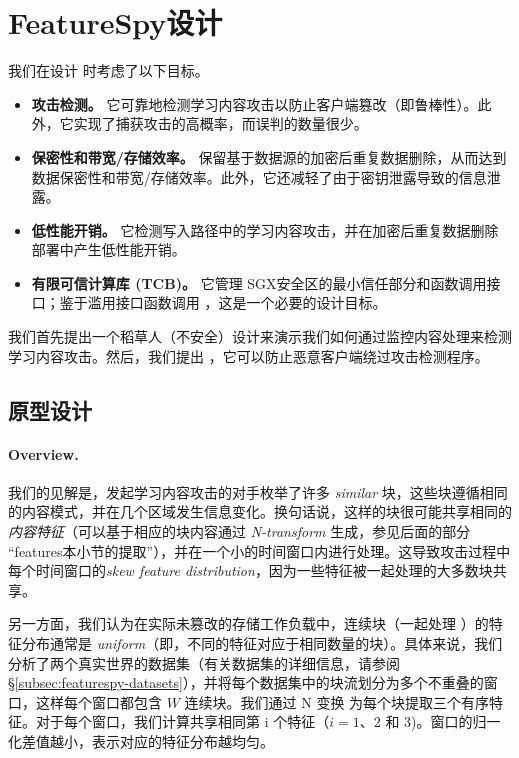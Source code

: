 \section{FeatureSpy设计}
\label{sec:featurespy-design}
我们在设计 \sysnameF 时考虑了以下目标。

\begin{itemize}[leftmargin=*]
\item {\bf 攻击检测。} 它可靠地检测学习内容攻击以防止客户端篡改（即鲁棒性）。此外，它实现了捕获攻击的高概率，而误判的数量很少。
\item {\bf 保密性和带宽/存储效率。} 保留基于数据源的加密后重复数据删除，从而达到数据保密性和带宽/存储效率。此外，它还减轻了由于密钥泄露导致的信息泄露。
\item {\bf 低性能开销。} 它检测写入路径中的学习内容攻击，并在加密后重复数据删除部署中产生低性能开销。
\item {\bf 有限可信计算库 (TCB)。} 它管理 SGX安全区的最小信任部分和函数调用接口；鉴于滥用接口函数调用 \cite{lie05}，这是一个必要的设计目标。
\end{itemize}

我们首先提出一个稻草人（不安全）设计来演示我们如何通过监控内容处理来检测学习内容攻击。然后，我们提出 \sysnameF，它可以防止恶意客户端绕过攻击检测程序。


\subsection{原型设计}
\label{subsec:featurespy-basic}
\paragraph*{Overview.} 我们的见解是，发起学习内容攻击的对手枚举了许多 {\em similar} 块，这些块遵循相同的内容模式，并在几个区域发生信息变化。换句话说，这样的块很可能共享相同的 {\em 内容特征}（可以基于相应的块内容通过 {\em N-transform} \cite{shilane12} 生成，参见后面的部分 “features本小节的提取”），并在一个小的时间窗口内进行处理。这导致攻击过程中每个时间窗口的{\em skew feature distribution}，因为一些特征被一起处理的大多数块共享。

另一方面，我们认为在实际未篡改的存储工作负载中，连续块（一起处理 \cite{zhu08}）的特征分布通常是 {\em uniform}（即，不同的特征对应于相同数量的块）。具体来说，我们分析了两个真实世界的数据集（有关数据集的详细信息，请参阅 \S\ref{subsec:featurespy-datasets}），并将每个数据集中的块流划分为多个不重叠的窗口，这样每个窗口都包含 $W$ 连续块。我们通过 N 变换 \cite{shilane12} 为每个块提取三个有序特征。对于每个窗口，我们计算共享相同第 i 个特征（$ i=1、2$ 和 $3$)。窗口的归一化差值越小，表示对应的特征分布越均匀。


